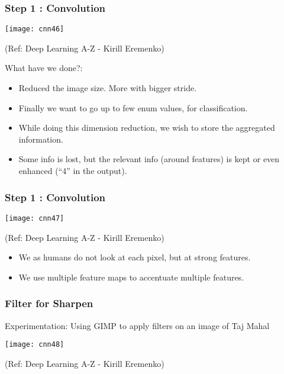 \begin{frame}[fragile] \frametitle{Step 1 : Convolution}

\begin{center}
\texttt{[image: cnn46]}

\tiny{(Ref: Deep Learning A-Z - Kirill Eremenko)}
\end{center}

What have we done?:
\begin{itemize}
\item Reduced the image size. More with bigger stride.
\item Finally we want to go up to few enum values, for classification.
\item While doing this dimension reduction, we wish to store the aggregated information.
\item Some info is lost, but the relevant info (around features) is kept or even enhanced (``4'' in the output).
\end{itemize}

\end{frame}

\begin{frame}[fragile] \frametitle{Step 1 : Convolution}

\begin{center}
\texttt{[image: cnn47]}

\tiny{(Ref: Deep Learning A-Z - Kirill Eremenko)}
\end{center}

\begin{itemize}
\item We as humans do not look at each pixel, but at strong features.
\item We use multiple feature maps to accentuate multiple features.
\end{itemize}

\end{frame}

\begin{frame}[fragile] \frametitle{Filter for Sharpen}
Experimentation: Using GIMP to apply filters on an image of Taj Mahal

\begin{center}
\texttt{[image: cnn48]}

\tiny{(Ref: Deep Learning A-Z - Kirill Eremenko)}
\end{center}

\end{frame}

